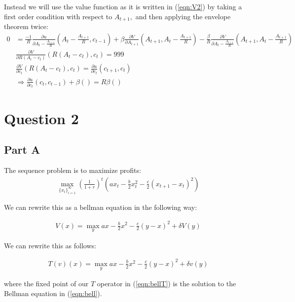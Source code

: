 \documentclass[11pt]{article} %
\begin{document}

Instead we will use the value function as it is written in (\ref{eqn:V2}) by taking a first order condition with respect to $A_{t+1},$ and then applying the envelope theorem twice:
\begin{align*}
0 &=\frac{-1}{R}\frac{\partial u}{\partial A_t - \frac{A_{t+1}}{R}}\left(A_t - \frac{A_{t+1}}{R},c_{t-1}\right) + \beta \frac{\partial V}{\partial A_{t+1}}\left(A_{t+1},A_t - \frac{A_{t+1}}{R}\right) - \frac{\beta}{R} \frac{\partial V}{\partial A_t - \frac{A_{t+1}}{R}}\left(A_{t+1},A_t - \frac{A_{t+1}}{R}\right)\\
&\frac{\partial V}{\partial R(A_t - c_t)}(R(A_t - c_t),c_t) = 999\\
&\frac{\partial V}{\partial c_t}(R(A_t - c_t),c_t) = \frac{\partial u}{\partial c_t}(c_{t+1},c_{t}) \\
&\Rightarrow \frac{\partial u}{\partial c_t}(c_t,c_{t-1}) + \beta () = R\beta ()
\end{align*}

\section{Question 2}
\subsection{Part A}
The sequence problem is to maximize profits:
\begin{align*}
\max_{\{ x_t\}_{i=1}^{\infty}} \left( \frac{1}{1+r} \right)^{t}\left( ax_t - \frac{b}{2}x_t^2 - \frac{c}{2}(x_{t+1}-x_t)^2\right)
\end{align*}

We can rewrite this as a bellman equation in the following way:

\begin{align}
V(x) =\max_{y} ax - \frac{b}{2}x^2 - \frac{c}{2}(y-x)^2 + \delta V(y) \label{eqn:bell}
\end{align}

We can rewrite this as follows:

\begin{align}
T(v)(x) =\max_{y} ax - \frac{b}{2}x^2 - \frac{c}{2}(y-x)^2 + \delta v(y) \label{eqn:bellT}
\end{align}

where the fixed point of our $T$ operator in (\ref{eqn:bellT}) is the solution to the Bellman equation in (\ref{eqn:bell}).
\end{document}
